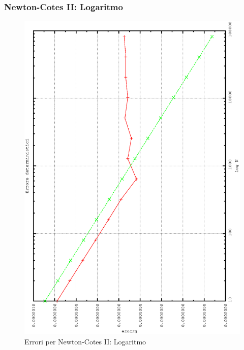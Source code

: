 \subsubsection{Newton-Cotes II: Logaritmo}
\begin{figure}[!h]
\centering
\includegraphics[width=0.7\columnwidth,angle = -90]{plot_simp_log.eps}
\caption{\small{Errori per Newton-Cotes II: Logaritmo}}
\end{figure}

